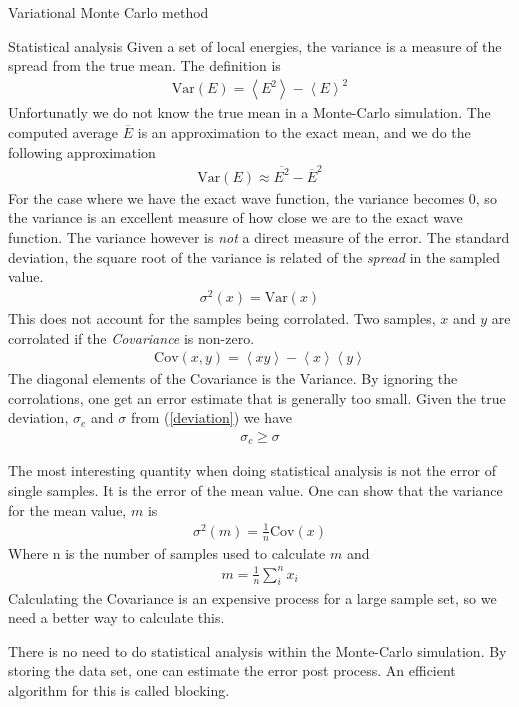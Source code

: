 \documentclass[a4paper, 12pt, titlepage]{article}
\begin{document}
\begin{section}{Variational Monte Carlo method}
\begin{subsection}{Statistical analysis}
 Given a set of local energies, the variance is a measure of the spread from the true mean. The definition is
 \begin{align*}
 	\text{Var}(E) = \left< E^2 \right> - \left< E \right> ^2 
 \end{align*}
 Unfortunatly we do not know the true mean in a Monte-Carlo simulation. The computed average $\overline E$ is an approximation to the exact mean, and we do the following approximation
 \begin{align*}
 	\text{Var}(E) \approx \overline{E^2} - \overline{E}^2 
 \end{align*}
 For the case where we have the exact wave function, the variance becomes $0$, so the variance is an excellent measure of how close we are to the exact wave function. The variance however is \textit{not} a direct measure of the error. The standard deviation, the square root of the variance is related of the \textit{spread} in the sampled value. 
 \begin{align}
 	\sigma ^2(x) = \text{Var}(x)
 	\label{deviation}
 \end{align}
 This does not account for the samples being corrolated. Two samples, $x$ and $y$ are corrolated if the \textit{Covariance} is non-zero.
 \begin{align*}
 	\text{Cov}(x,y) = \left< xy \right> - \left< x \right> \left<y \right> 
 \end{align*}
 The diagonal elements of the Covariance is the Variance. By ignoring the corrolations, one get an error estimate that is generally too small. Given the true deviation, $\sigma_e$ and $\sigma$ from (\ref{deviation}) we have
 \begin{align*}
 	\sigma_c \geq \sigma
 \end{align*}

 The most interesting quantity when doing statistical analysis is not the error of single samples. It is the error of the mean value. One can show that the variance for the mean value, $m$ is 
 \begin{align}
 	\sigma^2 (m) = \frac{1}{n} \text{Cov}(x)
 	\label{covariance}
 \end{align}
 Where n is the number of samples used to calculate $m$ and 
 \begin{align*}
 	m = \frac{1}{n} \sum_i^n x_i
 \end{align*}
 Calculating the Covariance is an expensive process for a large sample set, so we need a better way to calculate this. 

 There is no need to do statistical analysis within the Monte-Carlo simulation. By storing the data set, one can estimate the error post process. An efficient algorithm for this is called blocking. 


\end{subsection}
\end{section}
\end{document}
